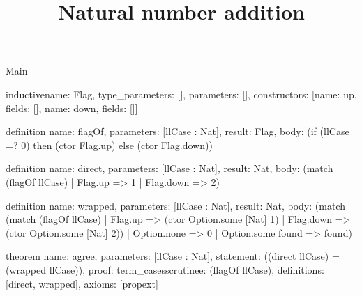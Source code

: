 \begin{lexlean}{Main}
\title{Natural number addition}
\begin{semanticmodule}
inductive{name: Flag, type_parameters: [], parameters: [], constructors: [{name: up, fields: []}, {name: down, fields: []}]}

definition{
  name: flagOf,
  parameters: [llCase : Nat],
  result: Flag,
  body: (if (llCase =? 0) then (ctor Flag.up) else (ctor Flag.down))
}

definition{
  name: direct,
  parameters: [llCase : Nat],
  result: Nat,
  body: (match (flagOf llCase)
    | Flag.up => 1
    | Flag.down => 2)
}

definition{
  name: wrapped,
  parameters: [llCase : Nat],
  result: Nat,
  body: (match (match (flagOf llCase)
    | Flag.up => (ctor Option.some [Nat] 1)
    | Flag.down => (ctor Option.some [Nat] 2))
    | Option.none => 0
    | Option.some found => found)
}

theorem{
  name: agree,
  parameters: [llCase : Nat],
  statement: ((direct llCase) = (wrapped llCase)),
  proof: term_cases{scrutinee: (flagOf llCase), definitions: [direct, wrapped]},
  axioms: [propext]
}
\end{semanticmodule}
\end{lexlean}
